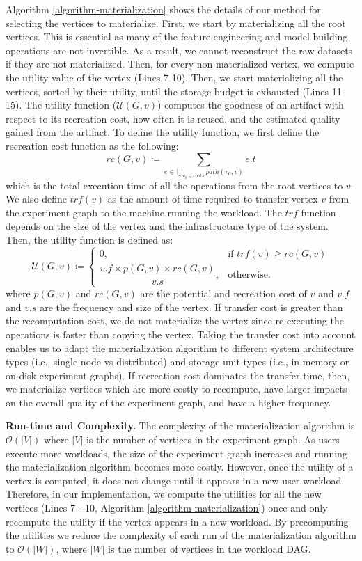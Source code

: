 Algorithm \ref{algorithm-materialization} shows the details of our method for selecting the vertices to materialize.
First, we start by materializing all the root vertices.
This is essential as many of the feature engineering and model building operations are not invertible.
As a result, we cannot reconstruct the raw datasets if they are not materialized.
Then, for every non-materialized vertex, we compute the utility value of the vertex (Lines 7-10).
Then, we start materializing all the vertices, sorted by their utility, until the storage budget is exhausted (Lines 11-15).
The utility function ($\mathcal{U}(G,v) $) computes the goodness of an artifact with respect to its recreation cost, how often it is reused, and the estimated quality gained from the artifact.
To define the utility function, we first define the recreation cost function as the following:  
\[
rc(G,v) \coloneqq \sum\limits_{e \in \bigcup\limits_{v_{0}\in roots} path(v_{0}, v)} e.t
\]
which is the total execution time of all the operations from the root vertices to $v$.
We also define $trf(v)$ as the amount of time required to transfer vertex $v$ from the experiment graph to the machine running the workload.
The $trf$ function depends on the size of the vertex and the infrastructure type of the system.
Then, the utility function is defined as: 
\[
\mathcal{U}(G,v) \coloneqq  	
		\begin{cases}
		0, & \text{if }  trf(v) \ge rc(G,v)  \\ 
		\dfrac{v.f \times p(G, v) \times rc(G,v)}{v.s}, & \text{otherwise}.
		\end{cases}
\]
where $p(G, v)$ and $rc(G,v)$ are the potential and recreation cost of $v$ and $v.f$ and $v.s$ are the frequency and size of the vertex.
If transfer cost is greater than the recomputation cost, we do not materialize the vertex since re-executing the operations is faster than copying the vertex.
Taking the transfer cost into account enables us to adapt the materialization algorithm to different system architecture types (i.e., single node vs distributed) and storage unit types (i.e., in-memory or on-disk experiment graphs).
If recreation cost dominates the transfer time, then, we materialize vertices which are more costly to recompute, have larger impacts on the overall quality of the experiment graph, and have a higher frequency.

\textbf{Run-time and Complexity.}
The complexity of the materialization algorithm is $\mathcal{O}(|V|)$ where $|V|$ is the number of vertices in the experiment graph.
As users execute more workloads, the size of the experiment graph increases and running the materialization algorithm becomes more costly.
However, once the utility of a vertex is computed, it does not change until it appears in a new user workload.
Therefore, in our implementation, we compute the utilities for all the new vertices (Lines 7 - 10, Algorithm \ref{algorithm-materialization}) once and only recompute the utility if the vertex appears in a new workload.
By precomputing the utilities we reduce the complexity of each run of the materialization algorithm to $\mathcal{O}(|W|)$, where $|W|$ is the number of vertices in the workload DAG.


